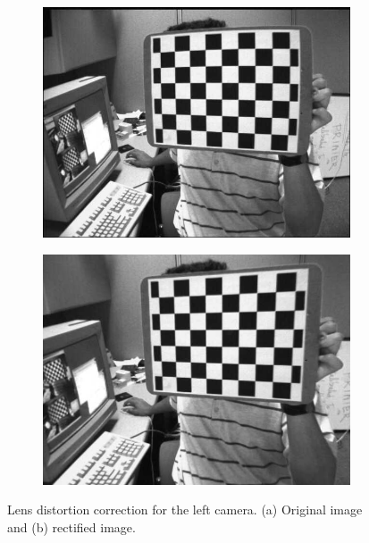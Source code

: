 \documentclass[journal]{IEEEtran}
\begin{document}
\FloatBarrier

\begin{figure}[htp]
  \centering
  \begin{subfigure}[b]{2.5in}
    \centering
    \includegraphics[width=\textwidth]{imgs/6.3_left_orig.png}
    \caption{}
  \end{subfigure}

  \begin{subfigure}[b]{2.5in}
    \centering
    \includegraphics[width=\textwidth]{imgs/6.3_left_undist.png}
    \caption{}
  \end{subfigure}
  \caption{Lens distortion correction for the left camera. (a) Original image and (b) rectified image.}
  \label{fig:left_lens_dist}
\end{figure}
\FloatBarrier
\end{document}
